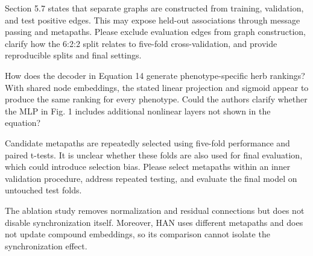 \documentclass[11pt,american]{article}
\begin{document}
\begin{revcomment}
Section 5.7 states that separate graphs are constructed from training, validation, and test positive edges. This may expose held-out associations through message passing and metapaths. Please exclude evaluation edges from graph construction, clarify how the 6:2:2 split relates to five-fold cross-validation, and provide reproducible splits and final settings.
\end{revcomment}

\begin{revresponse}

\end{revresponse}

\begin{revcomment}
How does the decoder in Equation 14 generate phenotype-specific herb rankings? With shared node embeddings, the stated linear projection and sigmoid appear to produce the same ranking for every phenotype. Could the authors clarify whether the MLP in Fig. 1 includes additional nonlinear layers not shown in the equation?
\end{revcomment}

\begin{revresponse}

\end{revresponse}

\begin{revcomment}
Candidate metapaths are repeatedly selected using five-fold performance and paired t-tests. It is unclear whether these folds are also used for final evaluation, which could introduce selection bias. Please select metapaths within an inner validation procedure, address repeated testing, and evaluate the final model on untouched test folds.
\end{revcomment}

\begin{revresponse}

\end{revresponse}

\begin{revcomment}
The ablation study removes normalization and residual connections but does not disable synchronization itself. Moreover, HAN uses different metapaths and does not update compound embeddings, so its comparison cannot isolate the synchronization effect.
\end{revcomment}
\end{document}
